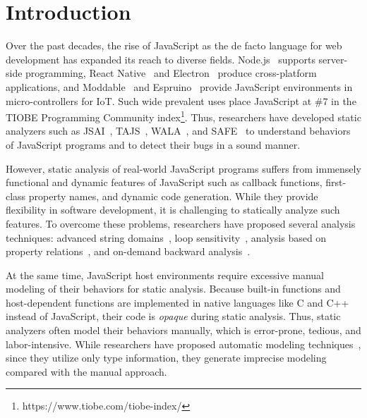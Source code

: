 \section{Introduction}\label{sec:intro}
Over the past decades, the rise of JavaScript as the de facto
language for web development has expanded its reach to diverse fields.
Node.js~\cite{nodejs} supports server-side programming, React
Native~\cite{react-native} and Electron~\cite{electron} produce cross-platform
applications, and Moddable~\cite{moddable} and Espruino~\cite{espruino}
provide JavaScript environments in micro-controllers for IoT.  Such wide prevalent
uses place JavaScript at \#7 in the TIOBE Programming Community
index\footnote{https://www.tiobe.com/tiobe-index/}.  Thus, researchers have
developed static analyzers such as JSAI~\cite{jsai}, TAJS~\cite{tajs},
WALA~\cite{wala}, and SAFE~\cite{safe,safe2} to understand behaviors of
JavaScript programs and to detect their bugs in a sound manner.

However, static analysis of real-world JavaScript programs suffers from immensely
functional and dynamic features of JavaScript such as callback
functions, first-class property names, and dynamic code generation.
While they provide flexibility in software development, it is
challenging to statically analyze such features.  To overcome these problems,
researchers have proposed several analysis techniques: advanced string
domains~\cite{string, regex, combining-string}, loop sensitivity~\cite{lsaECOOP,
lsaSPE}, analysis based on property relations~\cite{correlation, weaklyAPLAS,
weaklySPE, value-partitioning}, and on-demand backward
analysis~\cite{value-refinement}.

At the same time, JavaScript host environments require excessive
manual modeling of their behaviors for static analysis.  Because built-in functions and
host-dependent functions are implemented in native languages like C and
C++ instead of JavaScript, their code is \textit{opaque} during static
analysis.  Thus, static analyzers often model their behaviors
manually, which is error-prone, tedious, and labor-intensive.
While researchers have proposed automatic modeling
techniques~\cite{safewapi, model-ts}, since they utilize only type
information, they generate imprecise modeling compared with the manual approach.

